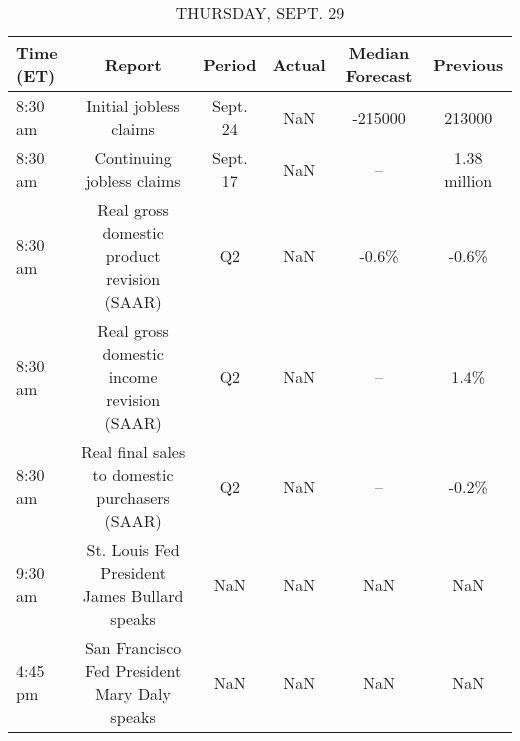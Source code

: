 \documentclass{article}%
\begin{document}
\begin{table}[htbp]%
\caption{THURSDAY, SEPT. 29}%
\centering%
\begin{adjustbox}{width=1\textwidth}%
\begin{tabular}{lccccc}
\toprule
Time (ET) &                                         Report &   Period & Actual & Median Forecast &     Previous \\
\midrule
  8:30 am &                         Initial jobless claims & Sept. 24 &    NaN &         -215000 &       213000 \\
  8:30 am &                      Continuing jobless claims & Sept. 17 &    NaN &              -- & 1.38 million \\
  8:30 am &    Real gross domestic product revision (SAAR) &       Q2 &    NaN &           -0.6\% &        -0.6\% \\
  8:30 am &     Real gross domestic income revision (SAAR) &       Q2 &    NaN &              -- &         1.4\% \\
  8:30 am & Real final sales to domestic purchasers (SAAR) &       Q2 &    NaN &              -- &        -0.2\% \\
  9:30 am &   St. Louis Fed President James Bullard speaks &      NaN &    NaN &             NaN &          NaN \\
  4:45 pm &   San Francisco Fed President Mary Daly speaks &      NaN &    NaN &             NaN &          NaN \\
\bottomrule
\end{tabular}
%
\end{adjustbox}%
\end{table}

%
\end{document}
